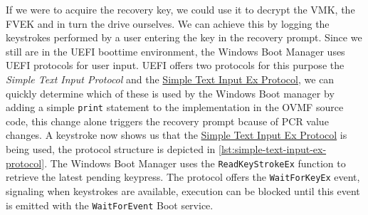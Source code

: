 If we were to acquire the recovery key, we could use it to decrypt the \ac{VMK}, the \ac{FVEK} and in turn the drive ourselves.
We can achieve this by logging the keystrokes performed by a user entering the key in the recovery prompt.
Since we still are in the \ac{UEFI} boottime environment, the Windows Boot Manager uses \ac{UEFI} protocols for user input.
\ac{UEFI} offers two protocols for this purpose the \emph{Simple Text Input Protocol} and the \hyperref[lst:simple-text-input-ex-protocol]{Simple Text Input Ex Protocol}, we can quickly determine which of these is used by the Windows Boot manager by adding a simple \lstinline{print} statement to the implementation in the \ac{OVMF} source code, this change alone triggers the recovery prompt bcause of \ac{PCR} value changes.
A keystroke now shows us that the \hyperref[lst:simple-text-input-ex-protocol]{Simple Text Input Ex Protocol} is being used, the protocol structure is depicted in \autoref{lst:simple-text-input-ex-protocol}.
The Windows Boot Manager uses the \lstinline{ReadKeyStrokeEx} function to retrieve the latest pending keypress.
The protocol offers the \lstinline{WaitForKeyEx} event, signaling when keystrokes are available, execution can be blocked until this event is emitted with the \lstinline{WaitForEvent} Boot service.


